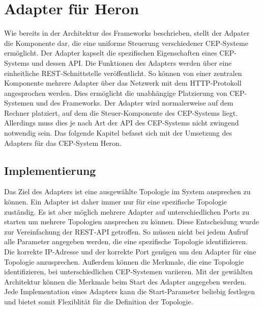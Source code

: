 \chapter{Adapter für Heron}

Wie bereits in der Architektur des Frameworks beschrieben, stellt der Adpater die Komponente dar, die eine uniforme Steuerung verschiedener CEP-Systeme ermöglicht.
Der Adapter kapselt die spezifischen Eigenschaften eines CEP-Systems und dessen API.
Die Funktionen des Adapters werden über eine einheitliche REST-Schnittstelle veröffentlicht.
So können von einer zentralen Komponente mehrere Adapter über das Netzwerk mit dem HTTP-Protokoll angesprochen werden.
Dies ermöglicht die unabhängige Platzierung von CEP-Systemen und des Frameworks.
Der Adapter wird normalerweise auf dem Rechner platziert, auf dem die Steuer-Komponente des CEP-Systems liegt.
Allerdings muss dies je nach Art der API des CEP-Systems nicht zwingend notwendig sein.
Das folgende Kapitel befasst sich mit der Umsetzung des Adapters für das CEP-System Heron.

\section{Implementierung}

Das Ziel des Adapters ist eine ausgewählte Topologie im System ansprechen zu können.
Ein Adapter ist daher immer nur für eine spezifische Topologie zuständig.
Es ist aber möglich mehrere Adapter auf unterschiedlichen Ports zu starten um mehrere Topologien ansprechen zu können.
Diese Entscheidung wurde zur Vereinfachung der REST-API getroffen.
So müssen nicht bei jedem Aufruf alle Parameter angegeben werden, die eine spezifische Topologie identifizieren.
Die korrekte IP-Adresse und der korrekte Port genügen um den Adapter für eine Topologie anzusprechen.
Außerdem können die Merkmale, die eine Topologie identifizieren, bei unterschiedlichen CEP-Systemen variieren.
Mit der gewählten Architektur können die Merkmale beim Start des Adapter angegeben werden.
Jede Implementation eines Adapters kann die Start-Parameter beliebig festlegen und bietet somit Flexiblität für die Definition der Topologie.

